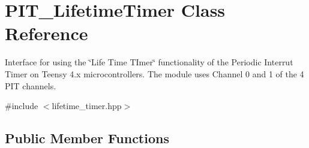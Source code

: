 \hypertarget{classPIT__LifetimeTimer}{}\section{P\+I\+T\+\_\+\+Lifetime\+Timer Class Reference}
\label{classPIT__LifetimeTimer}


Interface for using the \char`\"{}\+Life Time T\+Imer\char`\"{} functionality of the Periodic Interrut Timer on Teensy 4.\+x microcontrollers. The module uses Channel 0 and 1 of the 4 P\+IT channels.  




{\ttfamily \#include $<$lifetime\+\_\+timer.\+hpp$>$}

\subsection*{Public Member Functions}
